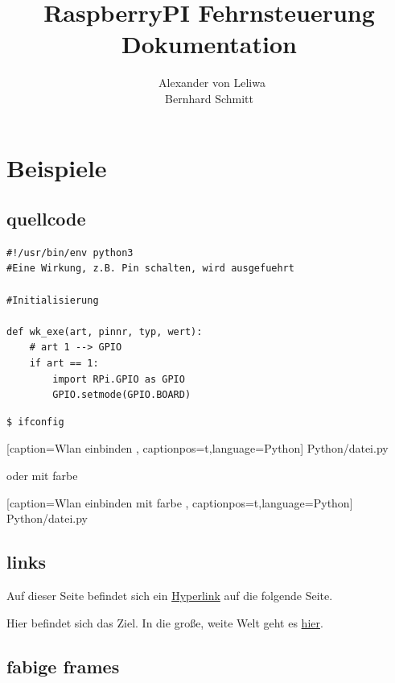 \documentclass[4paper,0pt]{article}
\author{\  Alexander von Leliwa \\ Bernhard Schmitt}
\title { \huge \bf RaspberryPI Fehrnsteuerung \\  \Huge Dokumentation }
\begin{document}
\maketitle
\newpage

\tableofcontents
\newpage

\section{Beispiele}

\subsection{quellcode}

\begin{lstlisting}
#!/usr/bin/env python3
#Eine Wirkung, z.B. Pin schalten, wird ausgefuehrt

#Initialisierung

def wk_exe(art, pinnr, typ, wert):
    # art 1 --> GPIO
    if art == 1:
        import RPi.GPIO as GPIO
        GPIO.setmode(GPIO.BOARD)
\end{lstlisting}

\begin{shaded}
\begin{lstlisting}
$ ifconfig
\end{lstlisting}
\end{shaded}


    [caption={Wlan einbinden}
       \label{lst:python},
       captionpos=t,language=Python]
{Python/datei.py}

oder mit farbe 

\begin{shaded}

    [caption={Wlan einbinden mit farbe}
       \label{lst:python},
       captionpos=t,language=Python]
{Python/datei.py}
\end{shaded}

\subsection{links}

Auf dieser Seite befindet sich ein \hyperlink{target}{Hyperlink} auf die folgende Seite.
 
\newpage
 
Hier befindet sich das \hypertarget{target}{Ziel}. In die große, weite Welt geht 
es \href{http://de.wikipedia.org/wiki/Welt}{hier}.

\subsection{fabige frames}
\end{document}

